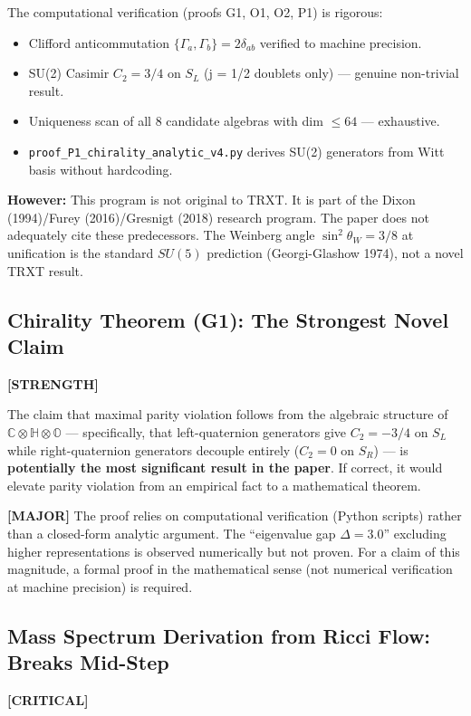 \documentclass[12pt, a4paper]{article}
\newcommand{\severity}[1]{\textcolor{critical}{\textbf{[CRITICAL]}}}
\newcommand{\major}{\textcolor{major}{\textbf{[MAJOR]}}}
\newcommand{\positive}{\textcolor{positive}{\textbf{[STRENGTH]}}}
\begin{document}
The computational verification (proofs G1, O1, O2, P1) is rigorous:
\begin{itemize}
    \item Clifford anticommutation $\{\Gamma_a, \Gamma_b\} = 2\delta_{ab}$ verified to machine precision.
    \item SU(2) Casimir $C_2 = 3/4$ on $S_L$ (j = 1/2 doublets only) --- genuine non-trivial result.
    \item Uniqueness scan of all 8 candidate algebras with dim $\leq 64$ --- exhaustive.
    \item \texttt{proof\_P1\_chirality\_analytic\_v4.py} derives SU(2) generators from Witt basis without hardcoding.
\end{itemize}

\textbf{However:} This program is not original to TRXT. It is part of the Dixon (1994)/Furey (2016)/Gresnigt (2018) research program. The paper does not adequately cite these predecessors. The Weinberg angle $\sin^2\theta_W = 3/8$ at unification is the standard $SU(5)$ prediction (Georgi-Glashow 1974), not a novel TRXT result.

\subsection{Chirality Theorem (G1): The Strongest Novel Claim}
\positive{}

The claim that maximal parity violation follows from the algebraic structure of $\mathbb{C} \otimes \mathbb{H} \otimes \mathbb{O}$ --- specifically, that left-quaternion generators give $C_2 = -3/4$ on $S_L$ while right-quaternion generators decouple entirely ($C_2 = 0$ on $S_R$) --- is \textbf{potentially the most significant result in the paper}. If correct, it would elevate parity violation from an empirical fact to a mathematical theorem.

\major{} The proof relies on computational verification (Python scripts) rather than a closed-form analytic argument. The ``eigenvalue gap $\Delta = 3.0$'' excluding higher representations is observed numerically but not proven. For a claim of this magnitude, a formal proof in the mathematical sense (not numerical verification at machine precision) is required.

\subsection{Mass Spectrum Derivation from Ricci Flow: Breaks Mid-Step}
\severity{C}
\end{document}
